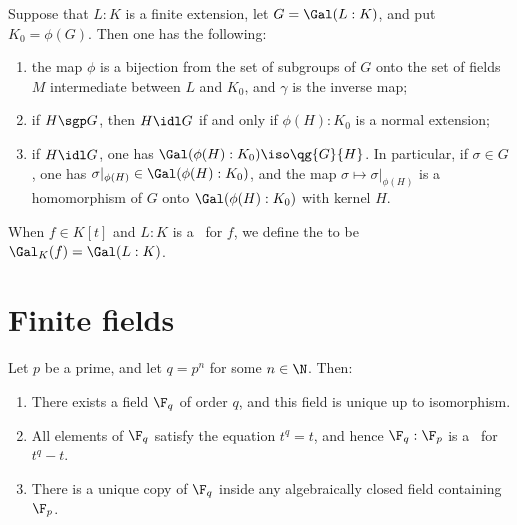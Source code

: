 \documentclass{article}
\begin{document}
\begin{ttheorem}
  Suppose that $ L:K $ is a finite extension, let $ G=\Gal(L:K) $, and put $ K_0=\phi(G) $.
  Then one has the following: \begin{enumerate}[label=(\alph*)]
    \item the map $ \phi $ is a bijection from the set of subgroups of $ G $ onto the set of fields $ M $ intermediate between $ L $ and $ K_0 $, and $ \gamma $ is the inverse map;
    \item if $ H \sgp G $, then $ H\idl G $ if and only if $ \phi(H):K_0 $ is a normal extension;
    \item if $ H\idl G $, one has $ \Gal(\phi(H):K_0) \iso \qg{G}{H} $.
      In particular, if $ \sigma\in G $, one has $ \sigma|_{\phi(H)} \in \Gal(\phi(H):K_0) $, and the map $ \sigma\mapsto\sigma|_{\phi(H)} $ is a homomorphism of $ G $ onto $ \Gal(\phi(H):K_0) $ with kernel $ H $.
  \end{enumerate}
\end{ttheorem}

\begin{tdefinition}
  When $ f\in K[t] $ and $ L:K $ is a \sfe~for $ f $, we define the  to be $ \Gal_K(f) = \Gal(L:K) $.
\end{tdefinition}


\section{Finite fields}
\begin{ttheorem}
  Let $ p $ be a prime, and let $ q=p^n $ for some $ n\in \N $.
  Then: \begin{enumerate}[label=(\alph*)]
    \item There exists a field $ \F_q $ of order $ q $, and this field is unique up to isomorphism.
    \item All elements of $ \F_q $ satisfy the equation $ t^q=t $, and hence $ \F_q:\F_p $ is a \sfe~for $ t^q-t $.
    \item There is a unique copy of $ \F_q $ inside any algebraically closed field containing $ \F_p $.
  \end{enumerate}
\end{ttheorem}
\end{document}
